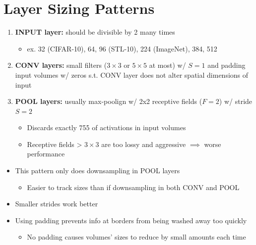 \documentclass[a4paper,12pt]{article}
\begin{document}
\section{Layer Sizing Patterns}
\begin{enumerate}
  \item \textbf{INPUT layer:} should be divisible by 2 many times
  \begin{itemize}
    \item ex. 32 (CIFAR-10), 64, 96 (STL-10), 224 (ImageNet), 384, 512
  \end{itemize}
  \item \textbf{CONV layers:} small filters ($3\times 3$ or $5\times 5$ at most) w/ $S=1$ and padding input volumes w/ zeros s.t. CONV layer does not alter spatial dimensions of input
  \item \textbf{POOL layers:} usually max-poolign w/ 2x2 receptive fields ($F=2$) w/ stride $S=2$
  \begin{itemize}
    \item Discards exactly 755 of activations in input volumes
    \item Receptive fields > $3\times 3$ are too lossy and aggressive $\implies$ worse performance
  \end{itemize}
\end{enumerate}

\begin{itemize}
  \item This pattern only does downsampling in POOL layers
  \begin{itemize}
    \item Easier to track sizes than if downsampling in both CONV and POOL
  \end{itemize}
  \item Smaller strides work better
  \item Using padding prevents info at borders from being washed away too quickly
  \begin{itemize}
    \item No padding causes volumes' sizes to reduce by small amounts each time
  \end{itemize}
\end{itemize}
\end{document}

